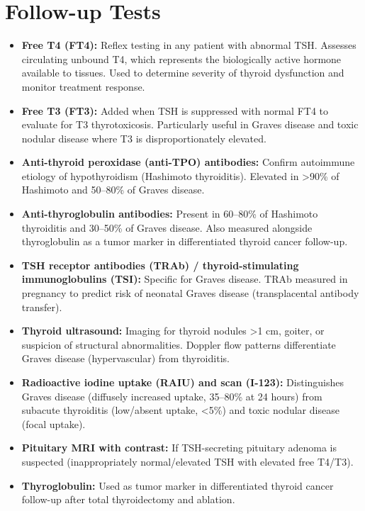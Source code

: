 \section*{Follow-up Tests}
\begin{itemize}
  \item \textbf{Free T4 (FT4):} Reflex testing in any patient with abnormal TSH. Assesses circulating unbound T4, which represents the biologically active hormone available to tissues. Used to determine severity of thyroid dysfunction and monitor treatment response.
  \item \textbf{Free T3 (FT3):} Added when TSH is suppressed with normal FT4 to evaluate for T3 thyrotoxicosis. Particularly useful in Graves disease and toxic nodular disease where T3 is disproportionately elevated.
  \item \textbf{Anti-thyroid peroxidase (anti-TPO) antibodies:} Confirm autoimmune etiology of hypothyroidism (Hashimoto thyroiditis). Elevated in >90\% of Hashimoto and 50--80\% of Graves disease.
  \item \textbf{Anti-thyroglobulin antibodies:} Present in 60--80\% of Hashimoto thyroiditis and 30--50\% of Graves disease. Also measured alongside thyroglobulin as a tumor marker in differentiated thyroid cancer follow-up.
  \item \textbf{TSH receptor antibodies (TRAb) / thyroid-stimulating immunoglobulins (TSI):} Specific for Graves disease. TRAb measured in pregnancy to predict risk of neonatal Graves disease (transplacental antibody transfer).
  \item \textbf{Thyroid ultrasound:} Imaging for thyroid nodules >1 cm, goiter, or suspicion of structural abnormalities. Doppler flow patterns differentiate Graves disease (hypervascular) from thyroiditis.
  \item \textbf{Radioactive iodine uptake (RAIU) and scan (I-123):} Distinguishes Graves disease (diffusely increased uptake, 35--80\% at 24 hours) from subacute thyroiditis (low/absent uptake, <5\%) and toxic nodular disease (focal uptake).
  \item \textbf{Pituitary MRI with contrast:} If TSH-secreting pituitary adenoma is suspected (inappropriately normal/elevated TSH with elevated free T4/T3).
  \item \textbf{Thyroglobulin:} Used as tumor marker in differentiated thyroid cancer follow-up after total thyroidectomy and ablation.
\end{itemize}

